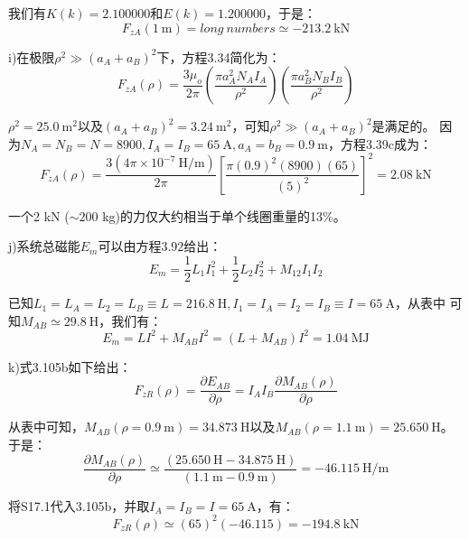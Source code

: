 我们有$K(k)=2.100000$和$E(k)=1.200000$，于是：
\begin{equation*}
F_{zA}(1\ \mathrm{m})=long\ numbers\simeq -213.2\ \mathrm{kN}
\end{equation*}


i)在极限$ρ^2\gg(a_A+a_B)^2$下，方程3.34简化为：
\begin{equation*}
F_{zA}(\rho)=\frac{3\mu_{o}}{2\pi}(\frac{\pi a_{A}^{2}N_{A}I_{A}}{\rho^{2}})(\frac{\pi a_{B}^{2}N_{B}I_{B}}{\rho^{2}})\tag{3.39c}%
\end{equation*}

$\rho^2=25.0\ \mathrm{m^2}$以及$(a_A+a_B)^2=3.24 \ \mathrm{m^2}$，可知$\rho^2\gg(a_A+a_B)^2$是满足的。
因为$N_A=N_B=N =8900, I_A=I_B=65\ \mathrm{A}, a_A=b_B=0.9\ \mathrm{m}$，方程3.39c成为：
\begin{equation*}
F_{zA}(\rho)=\frac{3(4\pi\times 10^{-7}\ \mathrm{H/m})}{2\pi}\left[\frac{\pi(0.9)^2(8900)(65)}{(5)^2}\right]^2=2.08\ \mathrm{kN}
\end{equation*}

一个2 kN ($\sim 200$ kg)的力仅大约相当于单个线圈重量的13\%。

j)系统总磁能$E_m$可以由方程3.92给出：
\begin{equation*}
E_{m}=\frac{1}{2}L_{1}I_{1}^{2}+\frac{1}{2}L_{2}I_{2}^{2}+M_{12}I_{1}I_{2}\tag{3.92}%
\end{equation*}

已知$L_1 = L_A = L_2 = L_B\equiv  L = 216.8\ \mathrm{H}, I_1 = I_A = I_2 = I_B\equiv I = 65\ \mathrm{A}$，从表中
可知$M_{AB}\simeq 29.8 \ \mathrm{H}$，我们有：
\begin{equation*}
	E_m=LI^2+M_{AB}I^2=(L+M_{AB})I^2=1.04\ \mathrm{MJ}
\end{equation*}

k)式3.105b如下给出：
\begin{equation*}
F_{zR}(\rho)=\frac{\partial E_{AB}}{\partial \rho}=I_{A}I_{B}\frac{\partial M_{AB}(\rho)}{\partial\rho}\tag{3.105b}%
\end{equation*}

从表中可知，$M_{AB}(\rho=0.9\ \mathrm{m})=34.873 \ \mathrm{H}$以及$M_{AB}(\rho=1.1\ \mathrm{m})=25.650\ \mathrm{H}$。于是：
\begin{equation*}
\frac{\partial M_{AB}(\rho)}{\partial\rho}\simeq\frac{(25.650 \ \mathrm{H}-34.87 5\ \mathrm{H})}{(1.1\ \mathrm{m}-0.9\ \mathrm{m})}=-46.115\ \mathrm{H/m}\tag{S17.1}%
\end{equation*}

将S17.1代入3.105b，并取$I_A=I_B=I =65\ \mathrm{A}$，有：
\begin{equation*}
F_{zR}(\rho)\simeq (65)^2(-46.115)=-194.8\ \mathrm{kN}
\end{equation*}

